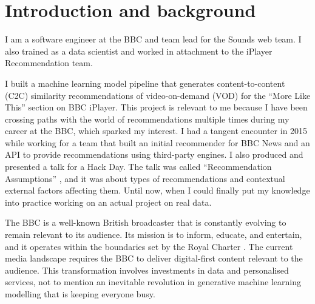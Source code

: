 
\section{Introduction and background}

I am a software engineer at the BBC and team lead for the Sounds web team.
I also trained as a data scientist and worked in attachment to the iPlayer Recommendation team.

I built a machine learning model pipeline that generates content-to-content (C2C) similarity recommendations
of video-on-demand (VOD) for the ``More Like This'' section on BBC iPlayer\cite{BBC:MoreLikeBluey}.
This project is relevant to me because I have been crossing paths with the world of recommendations multiple times
during my career at the BBC, which sparked my interest.
I had a tangent encounter in 2015 while working for a team that built
an initial recommender for BBC News and an API to provide recommendations using third-party engines.
I also produced and presented a talk for a Hack Day.
The talk was called ``Recommendation Assumptions'' \cite{RecsAssumptions},
and it was about types of recommendations and contextual external factors affecting them.
Until now, when I could finally put my knowledge into practice working on an actual project on real data.

The BBC is a well-known British broadcaster that is constantly evolving to remain relevant to its audience.
Its mission is to inform, educate, and entertain, and it operates within the boundaries set by the Royal Charter \cite{BBC:RoyalCharter}.
The current media landscape requires the BBC to deliver digital-first content relevant to the audience.
This transformation involves investments in data and personalised services,
not to mention an inevitable revolution in generative machine learning modelling that is keeping everyone busy.
